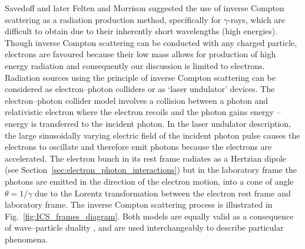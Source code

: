 \documentclass[../main.tex]{subfiles}
\begin{document}
Savedoff \cite{savedoff1959crab} and later Felten and Morrison \cite{felten1963recoil} suggested the use of inverse Compton scattering as a radiation production method, specifically for $\gamma$-rays, which are difficult to obtain due to their inherently short wavelengths (high energies). Though inverse Compton scattering can be conducted with any charged particle, electrons are favoured because their low mass allows for production of high energy radiation and consequently our discussion is limited to electrons. Radiation sources using the principle of inverse Compton scattering can be considered as electron--photon colliders or as `laser undulator' devices. The electron--photon collider model involves a collision between a photon and relativistic electron where the electron recoils and the photon gains energy -- energy is transferred to the incident photon. In the laser undulator description, the large sinusoidally varying electric field of the incident photon pulse causes the electrons to oscillate and therefore emit photons because the electrons are accelerated. The electron bunch in its rest frame radiates as a Hertzian dipole (see Section~\ref{sec:electron_photon_interactions}) but in the laboratory frame the photons are emitted in the direction of the electron motion, into a cone of angle $\theta = 1/\gamma$ due to the Lorentz transformation between the electron rest frame and laboratory frame. The inverse Compton scattering process is illustrated in Fig.~\ref{fig:ICS_frames_diagram}. Both models are equally valid as a consequence of wave--particle duality \cite{de1923waves}, and are used interchangeably to describe particular phenomena. 
\end{document}
